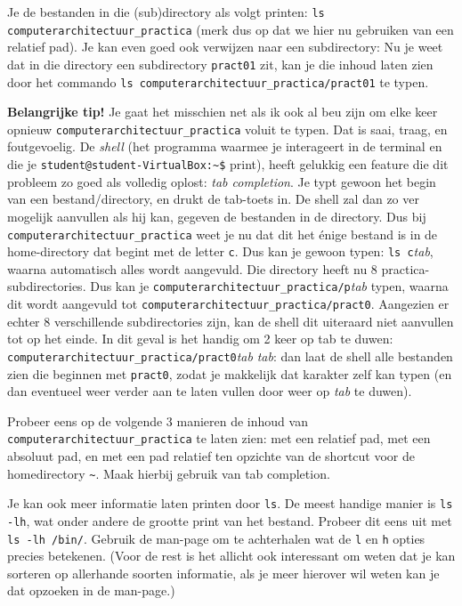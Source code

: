 \documentclass[a4paper,twoside,openany]{memoir}
\begin{document}
Je de bestanden in die (sub)directory als volgt printen: \verb!ls computerarchitectuur_practica!
(merk dus op dat we hier nu gebruiken van een relatief pad). Je kan even
goed ook verwijzen naar een subdirectory: Nu je weet dat in die directory
een subdirectory \verb!pract01!
zit, kan je die inhoud laten zien door het commando
\verb!ls computerarchitectuur_practica/pract01!
te typen.


\textbf{Belangrijke tip!} Je gaat het misschien net als ik ook al beu zijn om
elke keer opnieuw \verb!computerarchitectuur_practica! voluit te typen. Dat is
saai, traag, en foutgevoelig. De \emph{shell} (het programma waarmee je
interageert in de terminal en die je \verb!student@student-VirtualBox:~$!
print), heeft gelukkig een feature die dit probleem zo goed als volledig oplost:
\emph{tab completion}. Je typt gewoon het begin van een bestand/directory, en
drukt de tab-toets in. De shell zal dan zo ver mogelijk aanvullen als hij kan,
gegeven de bestanden in de directory. Dus bij
\verb!computerarchitectuur_practica! weet je nu dat dit het \'enige bestand is
in de home-directory dat begint met de letter \verb!c!. Dus kan je gewoon typen:
\verb!ls c!\emph{tab}, waarna automatisch alles wordt aangevuld. Die directory
heeft nu 8 practica-subdirectories. Dus kan je
\verb!computerarchitectuur_practica/p!\emph{tab} typen, waarna dit wordt
aangevuld tot \verb!computerarchitectuur_practica/pract0!. Aangezien er echter 8
verschillende subdirectories zijn, kan de shell dit uiteraard niet aanvullen tot
op het einde. In dit geval is het handig om 2 keer op tab te duwen:
\verb!computerarchitectuur_practica/pract0!\emph{tab} \emph{tab}: dan laat de
shell alle bestanden zien die beginnen met \verb!pract0!, zodat je makkelijk dat
karakter zelf kan typen (en dan eventueel weer verder aan te laten vullen door
weer op \emph{tab} te duwen).

Probeer eens op de volgende 3 manieren de inhoud van
\verb!computerarchitectuur_practica! te laten zien: met een relatief pad, met
een absoluut pad, en met een pad relatief ten opzichte van de shortcut voor de
homedirectory \verb!~!. Maak hierbij gebruik van tab completion.

Je kan ook meer informatie laten printen door \verb!ls!. De meest handige manier
is \verb!ls -lh!, wat onder andere de grootte print van het bestand. Probeer dit
eens uit met \verb!ls -lh /bin/!. Gebruik de man-page om te achterhalen wat de
\verb!l! en \verb!h! opties precies betekenen. (Voor de rest is het allicht ook
interessant om weten dat je kan sorteren op allerhande soorten informatie, als
je meer hierover wil weten kan je dat opzoeken in de man-page.)
\end{document}
